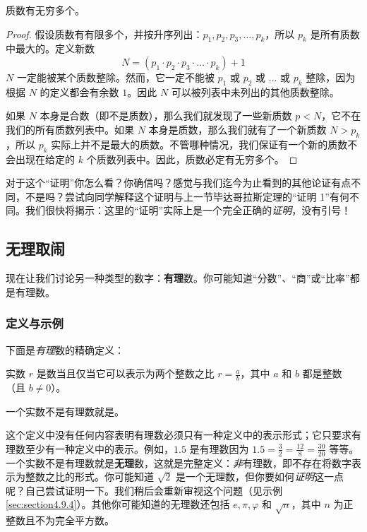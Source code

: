 \begin{theorem}[质数无限性]
    质数有无穷多个。
\end{theorem}

\begin{proof}
    假设质数有有限多个，并按升序列出：$p_1, p_2, p_3, \dots, p_k$，所以 $p_k$ 是所有质数中最大的。定义新数
    \[N = (p_1 \cdot p_2 \cdot p_3 \cdot \dots \cdot p_k) + 1\]
    $N$ 一定能被某个质数整除。然而，它一定不能被 $p_1$ 或 $p_2$ 或 $\dots$ 或 $p_k$ 整除，因为根据 $N$ 的定义都会有余数 $1$。因此 $N$ 可以被列表中未列出的其他质数整除。

    如果 $N$ 本身是合数（即不是质数），那么我们就发现了一些新质数 $p < N$，它不在我们的所有质数列表中。如果 $N$ 本身是质数，那么我们就有了一个新质数 $N > p_k$，所以 $p_k$ 实际上并不是最大的质数。不管哪种情况，我们保证有一个新的质数不会出现在给定的 $k$ 个质数列表中。因此，质数必定有无穷多个。
\end{proof}

对于这个``证明''你怎么看？你确信吗？感觉与我们迄今为止看到的其他论证有点不同，不是吗？尝试向同学解释这个证明与上一节毕达哥拉斯定理的``证明 1''有何不同。我们很快将揭示：这里的``证明''实际上是一个完全正确的\emph{证明}，没有引号！
    
\subsection{无理取闹}

现在让我们讨论另一种类型的数字：\textbf{有理}数。你可能知道``分数''、``商''或``比率''都是有理数。

\subsubsection*{定义与示例}

下面是\emph{有理}数的精确定义：

\begin{definition}
    实数 $r$ 是数当且仅当它可以表示为两个整数之比 $r = \frac{a}{b}$，其中 $a$ 和 $b$ 都是整数（且 $b \ne 0$）。

    一个实数不是有理数就是。
\end{definition}

这个定义中没有任何内容表明有理数必须只有一种定义中的表示形式；它只要求有理数至少有一种定义中的表示。例如，$1.5$ 是有理数因为 $1.5 = \frac{3}{2} = \frac{12}{8} = \frac{30}{20}$ 等等。一个实数不是有理数就是\textbf{无理}数，这就是完整定义：\emph{非}有理数，即不存在将数字表示为整数之比的形式。你可能知道 $\sqrt{2}$ 是一个无理数，但你要如何\emph{证明}这一点呢？自己尝试证明一下。我们稍后会重新审视这个问题（见示例 \ref{sec:section4.9.4}）。其他你可能知道的无理数还包括 $e, \pi, \varphi$ 和 $\sqrt{n}$，其中 $n$ 为正整数且不为完全平方数。

